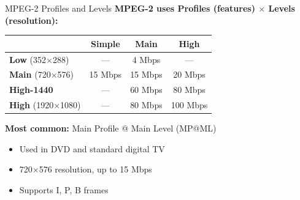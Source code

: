 \documentclass[aspectratio=169,12pt]{beamer}
\begin{document}
\begin{frame}{MPEG-2 Profiles and Levels}
    \textbf{MPEG-2 uses Profiles (features) $\times$ Levels (resolution):}
    
    \vspace{0.3cm}
    \begin{center}
        \small
        \begin{tabular}{l|c|c|c}
            \toprule
            & \textbf{Simple} & \textbf{Main} & \textbf{High} \\
            \midrule
            \textbf{Low} (352$\times$288) & --- & 4 Mbps & --- \\
            \textbf{Main} (720$\times$576) & 15 Mbps & 15 Mbps & 20 Mbps \\
            \textbf{High-1440} & --- & 60 Mbps & 80 Mbps \\
            \textbf{High} (1920$\times$1080) & --- & 80 Mbps & 100 Mbps \\
            \bottomrule
        \end{tabular}
    \end{center}
    
    \vspace{0.3cm}
    \textbf{Most common:} Main Profile @ Main Level (MP@ML)
    \begin{itemize}
        \item Used in DVD and standard digital TV
        \item 720$\times$576 resolution, up to 15 Mbps
        \item Supports I, P, B frames
    \end{itemize}
\end{frame}
\end{document}
